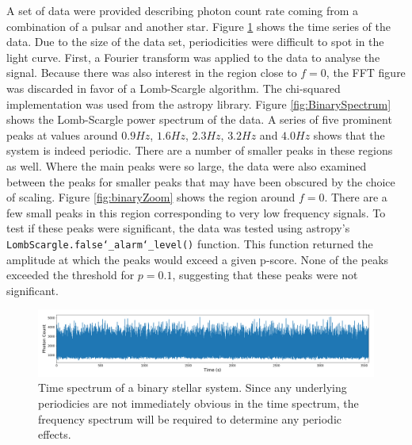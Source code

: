 \documentclass[twocolumn]{article}
\begin{document}
A set of data were provided describing photon count rate coming from a combination of a pulsar and another star. Figure \ref{fig:binary_time} shows the time series of the data. Due to the size of the data set, periodicities were difficult to spot in the light curve. First, a Fourier transform was applied to the data to analyse the signal. Because there was also interest in the region close to $f=0$, the FFT figure was discarded in favor of a Lomb-Scargle algorithm. The chi-squared implementation was used from the astropy library. Figure \ref{fig:BinarySpectrum} shows the Lomb-Scargle power spectrum of the data. A series of five prominent peaks at values around $0.9Hz$, $1.6Hz$, $2.3Hz$, $3.2Hz$ and $4.0Hz$ shows that the system is indeed periodic. There are a number of smaller peaks in these regions as well. Where the main peaks were so large, the data were also examined between the peaks for smaller peaks that may have been obscured by the choice of scaling. Figure \ref{fig:binaryZoom} shows the region around $f=0$. There are a few small peaks in this region corresponding to very low frequency signals. To test if these peaks were significant, the data was tested using astropy's \texttt{LombScargle.false\char`_alarm\char`_level()} function. This function returned the amplitude at which the peaks would exceed a given p-score. None of the peaks exceeded the threshold for $p=0.1$, suggesting that these peaks were not significant. 

\begin{figure}
\centering
\includegraphics[width=\textwidth]{binary_time}
\caption{Time spectrum of a binary stellar system. Since any underlying periodicies are not immediately obvious in the time spectrum, the frequency spectrum will be required to determine any periodic effects.}
\label{fig:binary_time}
\end{figure}
\end{document}
